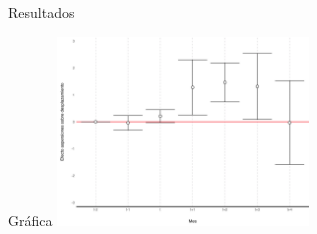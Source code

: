 \documentclass[
  ignorenonframetext,
]{beamer}
\begin{document}
\begin{frame}{Resultados}
\protect\hypertarget{resultados-1}{}
\begin{block}{Gráfica}
\protect\hypertarget{gruxe1fica}{}
\includegraphics[width=0.5\textwidth,height=\textheight]{media/DinamicEffectsNorm.png}
\end{block}


\end{frame}
\end{document}
